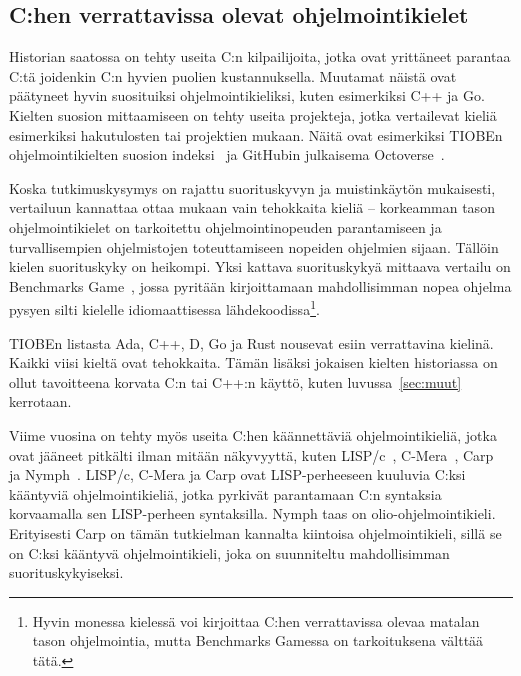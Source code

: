 \subsection{C:hen verrattavissa olevat ohjelmointikielet}

Historian saatossa on tehty useita C:n kilpailijoita, jotka ovat yrittäneet
parantaa C:tä joidenkin C:n hyvien puolien kustannuksella. Muutamat näistä ovat
päätyneet hyvin suosituiksi ohjelmointikieliksi, kuten esimerkiksi C++ ja Go.
Kielten suosion mittaamiseen on tehty useita projekteja, jotka vertailevat
kieliä esimerkiksi hakutulosten tai projektien mukaan. Näitä ovat esimerkiksi
TIOBEn ohjelmointikielten suosion indeksi~\citep{tiobe} ja GitHubin julkaisema
Octoverse~\citep{octoverse}.%

Koska tutkimuskysymys on rajattu suorituskyvyn ja muistinkäytön mukaisesti,
vertailuun kannattaa ottaa mukaan vain tehokkaita kieliä -- korkeamman tason
ohjelmointikielet on tarkoitettu ohjelmointinopeuden parantamiseen ja
turvallisempien ohjelmistojen toteuttamiseen nopeiden ohjelmien sijaan. Tällöin
kielen suorituskyky on heikompi. Yksi kattava suorituskykyä mittaava vertailu
on Benchmarks Game~\citep{benchmarks}, jossa pyritään kirjoittamaan
mahdollisimman nopea ohjelma pysyen silti kielelle idiomaattisessa
lähdekoodissa\footnote{Hyvin monessa kielessä voi kirjoittaa C:hen
verrattavissa olevaa matalan tason ohjelmointia, mutta Benchmarks Gamessa on
tarkoituksena välttää tätä.}.

TIOBEn listasta Ada, C++, D, Go ja Rust nousevat esiin verrattavina kielinä.
Kaikki viisi kieltä ovat tehokkaita. Tämän lisäksi jokaisen kielten historiassa
on ollut tavoitteena korvata C:n tai C++:n käyttö, kuten luvussa~\ref{sec:muut}
kerrotaan.

Viime vuosina on tehty myös useita C:hen käännettäviä ohjelmointikieliä, jotka
ovat jääneet pitkälti ilman mitään näkyvyyttä, kuten LISP/c~\citep{clisp1},
C-Mera~\citep{clisp2}, Carp~\citep{clisp3} ja Nymph~\citep{nymph}. LISP/c,
C-Mera ja Carp ovat LISP-perheeseen kuuluvia C:ksi kääntyviä ohjelmointikieliä,
jotka pyrkivät parantamaan C:n syntaksia korvaamalla sen LISP-perheen
syntaksilla. Nymph taas on olio-ohjelmointikieli. Erityisesti Carp on tämän
tutkielman kannalta kiintoisa ohjelmointikieli, sillä se on C:ksi kääntyvä
ohjelmointikieli, joka on suunniteltu mahdollisimman suorituskykyiseksi.

